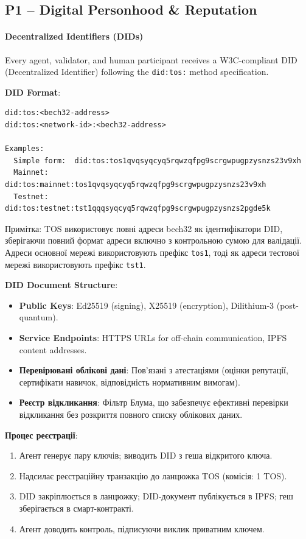 \documentclass[11pt]{article}
\begin{document}
\subsection{P1 -- Digital Personhood \& Reputation}
\label{sec:pillar-identity}

\paragraph{Decentralized Identifiers (DIDs)}
Every agent, validator, and human participant receives a W3C-compliant DID (Decentralized Identifier) following the \texttt{did:tos:} method specification.

\textbf{DID Format}:
\begin{verbatim}
did:tos:<bech32-address>
did:tos:<network-id>:<bech32-address>

Examples:
  Simple form:  did:tos:tos1qvqsyqcyq5rqwzqfpg9scrgwpugpzysnzs23v9xh
  Mainnet:      did:tos:mainnet:tos1qvqsyqcyq5rqwzqfpg9scrgwpugpzysnzs23v9xh
  Testnet:      did:tos:testnet:tst1qqqsyqcyq5rqwzqfpg9scrgwpugpzysnzs2pgde5k
\end{verbatim}
Примітка: TOS використовує повні адреси bech32 як ідентифікатори DID, зберігаючи повний формат адреси включно з контрольною сумою для валідації. Адреси основної мережі використовують префікс \texttt{tos1}, тоді як адреси тестової мережі використовують префікс \texttt{tst1}.

\textbf{DID Document Structure}:
\begin{itemize}[noitemsep]
  \item \textbf{Public Keys}: Ed25519 (signing), X25519 (encryption), Dilithium-3 (post-quantum).
  \item \textbf{Service Endpoints}: HTTPS URLs for off-chain communication, IPFS content addresses.
  \item \textbf{Перевірювані облікові дані}: Пов'язані з атестаціями (оцінки репутації, сертифікати навичок, відповідність нормативним вимогам).
  \item \textbf{Реєстр відкликання}: Фільтр Блума, що забезпечує ефективні перевірки відкликання без розкриття повного списку облікових даних.
\end{itemize}

\textbf{Процес реєстрації}:
\begin{enumerate}[noitemsep]
  \item Агент генерує пару ключів; виводить DID з геша відкритого ключа.
  \item Надсилає реєстраційну транзакцію до ланцюжка TOS (комісія: 1 TOS).
  \item DID закріплюється в ланцюжку; DID-документ публікується в IPFS; геш зберігається в смарт-контракті.
  \item Агент доводить контроль, підписуючи виклик приватним ключем.
\end{enumerate}
\end{document}
